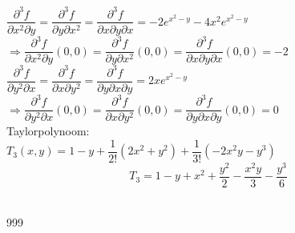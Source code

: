 \documentclass[a4paper]{article}
\begin{document}
$\dfrac{\partial^3 f}{\partial x^2 \partial y} = \dfrac{\partial^3 f}{\partial y \partial x^2} = \dfrac{\partial^3 f}{\partial x \partial y \partial x} = -2e^{x^2 - y} -4x^2e^{x^2 - y}$\\

$\Rightarrow \dfrac{\partial^3 f}{\partial x^2 \partial y}(0, 0) = \dfrac{\partial^3 f}{\partial y \partial x^2}(0, 0) = \dfrac{\partial^3 f}{\partial x \partial y \partial x}(0, 0) = -2$\\

$\dfrac{\partial^3 f}{\partial y^2 \partial x} = \dfrac{\partial^3 f}{\partial x \partial y^2} = \dfrac{\partial^3 f}{\partial y \partial x \partial y} = 2xe^{x^2 - y}$\\

$\Rightarrow \dfrac{\partial^3 f}{\partial y^2 \partial x}(0, 0) = \dfrac{\partial^3 f}{\partial x \partial y^2}(0, 0) = \dfrac{\partial^3 f}{\partial y \partial x \partial y}(0, 0) = 0$\\

Taylorpolynoom:\\

$T_3 (x, y) = 1 - y + \dfrac{1}{2!}\left(2x^2 + y^2\right) + \dfrac{1}{3!}(-2x^2 y - y^3)$\\

$$T_3 = 1 - y + x^2 + \dfrac{y^2}{2} - \dfrac{x^2 y}{3} - \dfrac{y^3}{6}$$\\

\begin{thebibliography}{999}
\end{thebibliography}
\end{document}
